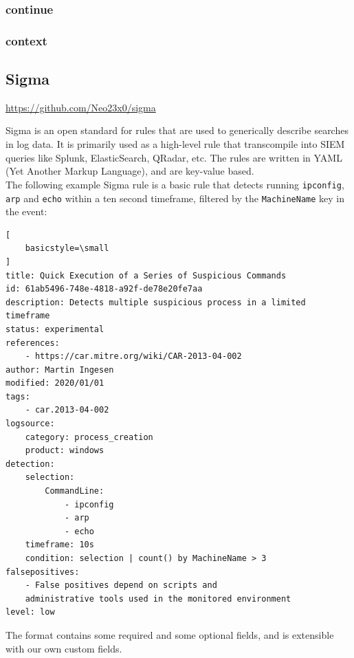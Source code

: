 \subsubsection{continue}

\subsubsection{context}


\subsection{Sigma}
\label{sub:sigma}
\url{https://github.com/Neo23x0/sigma}

Sigma is an open standard for rules that are used to generically describe searches in log data. It is primarily used as a high-level rule that transcompile into SIEM queries like Splunk, ElasticSearch, QRadar, etc. The rules are written in YAML (Yet Another Markup Language), and are key-value based.
\\
The following example Sigma rule is a basic rule that detects running \lstinline{ipconfig}, \lstinline{arp} and \lstinline{echo} within a ten second timeframe, filtered by the \lstinline{MachineName} key in the event: 

\begin{lstlisting}[
    basicstyle=\small
]
title: Quick Execution of a Series of Suspicious Commands
id: 61ab5496-748e-4818-a92f-de78e20fe7aa
description: Detects multiple suspicious process in a limited timeframe
status: experimental
references:
    - https://car.mitre.org/wiki/CAR-2013-04-002
author: Martin Ingesen
modified: 2020/01/01
tags:
    - car.2013-04-002
logsource:
    category: process_creation
    product: windows
detection:
    selection:
        CommandLine:
            - ipconfig
            - arp
            - echo
    timeframe: 10s
    condition: selection | count() by MachineName > 3
falsepositives:
    - False positives depend on scripts and
    administrative tools used in the monitored environment
level: low
\end{lstlisting}
The format contains some required and some optional fields, and is extensible with our own custom fields.

